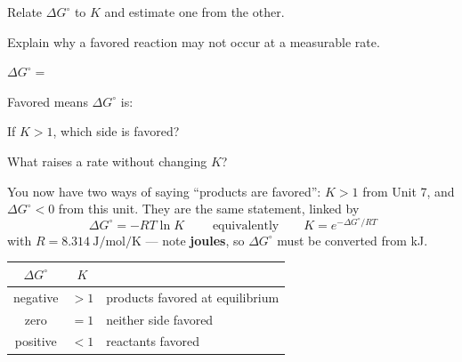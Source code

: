 \documentclass{apchem-notes}
\begin{document}
\begin{objectives}
  \item Relate $\Delta G^\circ$ to $K$ and estimate one from the other.
  \item Explain why a favored reaction may not occur at a measurable rate.
\end{objectives}


\begin{warmup}[4]
  \item $\Delta G^\circ = $ 
  \item Favored means $\Delta G^\circ$ is: 
  \item If $K > 1$, which side is favored?
  \item What raises a rate without changing $K$?
\end{warmup}



You now have two ways of saying ``products are favored'': $K > 1$ from
Unit 7, and $\Delta G^\circ < 0$ from this unit. They are the same
statement, linked by
\[ \boxed{\;\Delta G^\circ = -RT\ln K\;}
   \qquad\text{equivalently}\qquad K = e^{-\Delta G^\circ/RT} \]
with $R = \SI{8.314}{\joule\per\mole\per\kelvin}$ --- note \textbf{joules},
so $\Delta G^\circ$ must be converted from kJ.

\begin{center}
\begin{tabular}{@{}ccl@{}}
\hline
$\Delta G^\circ$ & $K$ & \\
\hline
negative & $> 1$ & products favored at equilibrium \\
zero     & $= 1$ & neither side favored \\
positive & $< 1$ & reactants favored \\
\hline
\end{tabular}
\end{center}
\end{document}
